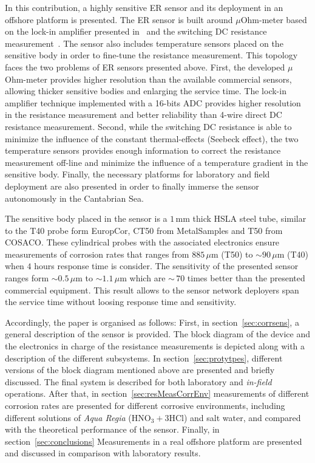 \documentclass[journal,twoside,web]{ieeecolor}
\begin{document}
In this contribution, a highly sensitive ER sensor and its deployment in an offshore platform is presented. The ER sensor is built around $\mu$Ohm-meter based on the lock-in amplifier presented in~\cite{bengtsson2012} and the switching DC resistance measurement~\cite{schweiger2010}. The sensor also includes temperature sensors placed on the sensitive body in order to fine-tune the resistance measurement. This topology faces the two problems of ER sensors presented above. First, the developed $\mu$Ohm-meter provides higher resolution than the available commercial sensors, allowing thicker sensitive bodies and enlarging the service time. The lock-in amplifier technique implemented with a 16-bits ADC provides higher resolution in the resistance measurement and better reliability than 4-wire direct DC resistance measurement. Second, while the switching DC resistance is able to minimize the influence of the constant thermal-effects (Seebeck effect), the two temperature sensors provides enough information to correct the resistance measurement off-line and minimize the influence of a temperature gradient in the sensitive body. Finally, the necessary platforms for laboratory and field deployment are also presented in order to finally immerse the sensor autonomously in the Cantabrian Sea. 

The sensitive body placed in the sensor is a $1$\,mm thick HSLA steel tube, similar to the T40 probe form EuropCor, CT50 from MetalSamples and T50 from COSACO.  These cylindrical probes with the associated electronics ensure measurements of corrosion rates that ranges from $885$\,$\mu$m (T50) to $\sim90$\,$\mu$m (T40) when $4$ hours response time is consider. The sensitivity of the presented sensor ranges form $\sim0.5$\,$\mu$m to $\sim1.1$\,$\mu$m which are $\sim$\,$70$ times better than the presented commercial equipment. This result allows to the sensor network deployers span the service time without loosing response time and sensitivity. 


Accordingly, the paper is organised as follows: First, in section~\ref{sec:corrsens}, a general description of the sensor is provided. The block diagram of the device and the electronics in charge of the resistance measurements is depicted along with a description of the different subsystems. In section~\ref{sec:protytpes}, different versions of the block diagram mentioned above are presented and briefly discussed. The final system is described for both laboratory and \textit{in-field} operations. After that, in section~\ref{sec:resMeasCorrEnv} measurements of different corrosion rates are presented for different corrosive environments, including different solutions of \textit{Aqua Regia} (HNO$_{3}+3$HCl) and salt water, and compared with the theoretical performance of the sensor. Finally, in
section~\ref{sec:conclusions} Measurements in a real offshore platform are presented and discussed in comparison with laboratory results.
\end{document}
